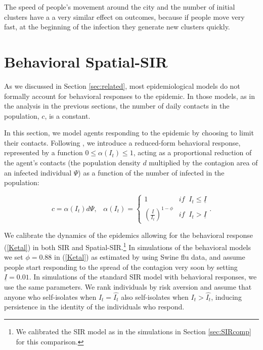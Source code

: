 \documentclass[english,11pt]{article}
\begin{document}
The speed of people's movement around the city and the number of initial clusters have a 
a very similar effect on outcomes, because if people move very fast, at the beginning of the infection
they generate new clusters quickly.  

\section{Behavioral Spatial-SIR \label{sec:behavioral}} 

As we discussed in Section \ref{sec:related}, most epidemiological models do not formally account for behavioral responses to the epidemic. In those models, as in the analysis in the previous sections,  the number of daily contacts in the population, $c$, is a constant. 

In this section, we model agents responding to the epidemic by choosing to limit their contacts. Following \cite{keppo2020behavioral}, we introduce a reduced-form behavioral response,  represented by a function $0 \leq \alpha( I_t) \leq 1$, acting as a proportional reduction of the agent's contacts (the population density $d$ multiplied by the contagion area of an infected individual $\Psi$) as a function of  the number of infected in the population:

\begin{equation} c=\alpha( I_t) d \Psi, \; \; \; 
    \alpha(I_{t})=\left\{ 
    \begin{array}{ll}   
        1  & if \; \;  I_{t} \leq \underline{I} \\ 
        \left( \frac{\underline{I}}{I_{t}} \right)^{1-\phi}  & if \; \;  I_{t}>\underline{I}
    \end{array} \right. .  
    \label{Ketal}
\end{equation}

We calibrate the dynamics of the epidemics allowing for the behavioral response (\ref{Ketal}) in  both SIR and Spatial-SIR.\footnote{We calibrated the SIR model as in the simulations in Section
\ref{sec:SIRcomp} for this comparison.} In simulations of the behavioral models  we set $\phi=0.88$ in (\ref{Ketal}) as estimated by
    \cite{keppo2020behavioral} using Swine flu data, and assume people start responding to the spread of the contagion very soon by setting $\underline{I}=0.01$. 
In simulations of the standard SIR model with behavioral
responses, we use the same parameters. We rank individuals by risk aversion and assume that anyone who self-isolates when $I_t=\hat{I_t}$ also self-isolates when $I_t>\hat{I_t}$, inducing persistence in the identity of the individuals who respond. 
\end{document}
